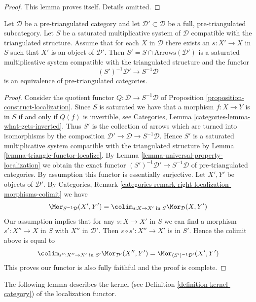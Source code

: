 \begin{proof}
This lemma proves itself. Details omitted.
\end{proof}

\begin{lemma}
\label{lemma-localization-subcategory}
Let $\mathcal{D}$ be a pre-triangulated category and let
$\mathcal{D}' \subset \mathcal{D}$ be a full, pre-triangulated subcategory.
Let $S$ be a saturated multiplicative system of $\mathcal{D}$
compatible with the triangulated structure. Assume that for each $X$
in $\mathcal{D}$ there exists an $s : X' \to X$ in $S$ such that $X'$ is
an object of $\mathcal{D}'$. Then
$S' = S \cap \text{Arrows}(\mathcal{D}')$ is a saturated
multiplicative system compatible with the triangulated structure and
the functor
$$
(S')^{-1}\mathcal{D}' \longrightarrow S^{-1}\mathcal{D}
$$
is an equivalence of pre-triangulated categories.
\end{lemma}

\begin{proof}
Consider the quotient functor $Q : \mathcal{D} \to S^{-1}\mathcal{D}$
of Proposition \ref{proposition-construct-localization}.
Since $S$ is saturated we have that a morphism $f : X \to Y$ is in
$S$ if and only if $Q(f)$ is invertible, see
Categories, Lemma \ref{categories-lemma-what-gets-inverted}.
Thus $S'$ is the collection of arrows which are turned into isomorphisms
by the composition $\mathcal{D}' \to \mathcal{D} \to S^{-1}\mathcal{D}$.
Hence $S'$ is a saturated multiplicative system compatible with the
triangulated structure by Lemma \ref{lemma-triangle-functor-localize}.
By Lemma \ref{lemma-universal-property-localization} we obtain the
exact functor $(S')^{-1}\mathcal{D}' \to S^{-1}\mathcal{D}$ of pre-triangulated
categories. By assumption this functor is essentially surjective.
Let $X', Y'$ be objects of $\mathcal{D}'$. By Categories, Remark
\ref{categories-remark-right-localization-morphisms-colimit} we have
$$
\Mor_{S^{-1}\mathcal{D}}(X', Y') =
\colim_{s : X \to X'\text{ in }S} \Mor_\mathcal{D}(X, Y')
$$
Our assumption implies that for any $s : X \to X'$ in $S$ we can
find a morphism $s' : X'' \to X$ in $S$ with $X''$ in $\mathcal{D}'$.
Then $s \circ s' : X'' \to X'$ is in $S'$. Hence the colimit above is
equal to
$$
\colim_{s'' : X'' \to X'\text{ in }S'} \Mor_{\mathcal{D}'}(X'', Y') =
\Mor_{(S')^{-1}\mathcal{D}'}(X', Y')
$$
This proves our functor is also fully faithful and the proof is complete.
\end{proof}

\noindent
The following lemma describes the kernel (see
Definition \ref{definition-kernel-category})
of the localization functor.

